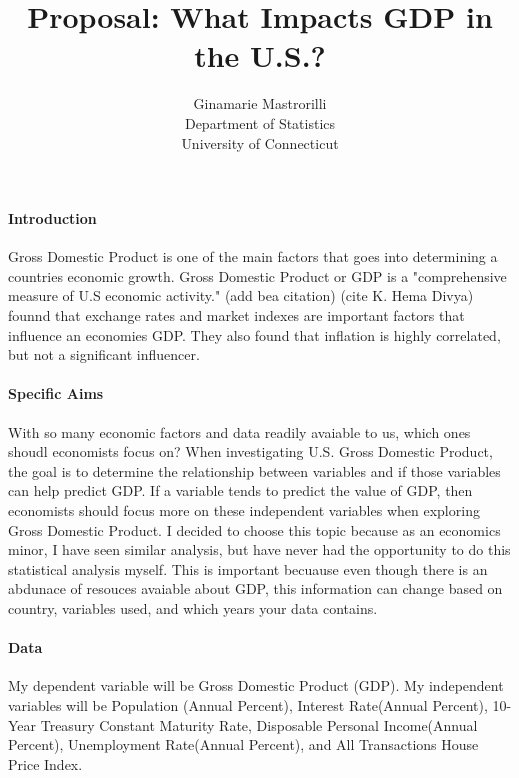 \documentclass[12pt]{article}
\title{Proposal: What Impacts GDP in the U.S.? }
\author{Ginamarie Mastrorilli\\
  Department of Statistics\\
  University of Connecticut
}
\begin{document}
\maketitle


\paragraph{Introduction}
Gross Domestic Product is one of the main factors that goes into determining a countries economic growth. Gross Domestic Product or GDP is a "comprehensive measure of U.S economic activity." (add bea citation) 
(cite K. Hema Divya) founnd that exchange rates and market indexes are important factors that influence an economies GDP. They also found that inflation is highly correlated, but not a significant influencer.  

\paragraph{Specific Aims}
With so many economic factors and data readily avaiable to us, which ones shoudl economists focus on?
When investigating U.S. Gross Domestic Product, the goal is to determine the relationship between variables and if those variables can help predict GDP.
If a variable tends to predict the value of GDP, then economists should focus more on these independent variables when exploring Gross Domestic Product.
I decided to choose this topic because as an economics minor, I have seen similar analysis, but have never had the opportunity to do this statistical analysis myself. 
This is important becuause even though there is an abdunace of resouces avaiable about GDP, this information can change based on country, variables used, and which years your data contains. 


\paragraph{Data}
My dependent variable will be Gross Domestic Product (GDP).
My independent variables will be Population (Annual Percent), Interest Rate(Annual Percent), 10-Year Treasury Constant Maturity Rate, Disposable Personal Income(Annual Percent), Unemployment Rate(Annual Percent), and All Transactions House Price Index. 
\end{document}
